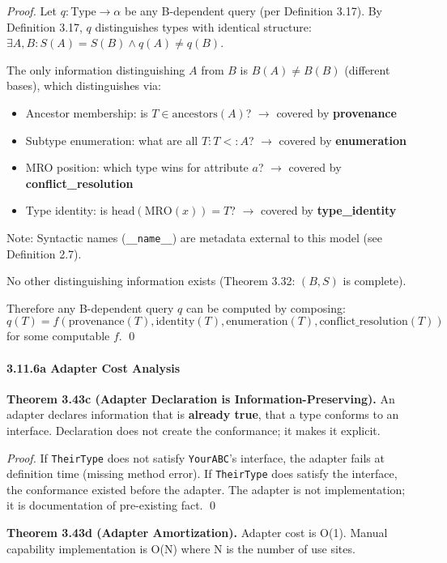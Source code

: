 \emph{Proof.} Let \(q : \text{Type} \to \alpha\) be any B-dependent
query (per Definition 3.17). By Definition 3.17, \(q\) distinguishes
types with identical structure:
\(\exists A, B: S(A) = S(B) \land q(A) \neq q(B)\).

The only information distinguishing \(A\) from \(B\) is \(B(A) \neq B(B)\) (different bases), which distinguishes via:
\begin{itemize}
  \item Ancestor membership: is \(T \in \text{ancestors}(A)\)? $\rightarrow$ covered by \textbf{provenance}
  \item Subtype enumeration: what are all \(T : T <: A\)? $\rightarrow$ covered by \textbf{enumeration}
  \item MRO position: which type wins for attribute \(a\)? $\rightarrow$ covered by \textbf{conflict\_resolution}
  \item Type identity: is \(\text{head}(\text{MRO}(x)) = T\)? $\rightarrow$ covered by \textbf{type\_identity}
\end{itemize}
Note: Syntactic names (\texttt{\_\_name\_\_}) are metadata external to this model (see Definition 2.7).

No other distinguishing information exists (Theorem 3.32: \((B, S)\)
is complete).

Therefore any B-dependent query \(q\) can be computed by composing:
\[q(T) = f(\text{provenance}(T), \text{identity}(T), \text{enumeration}(T), \text{conflict\_resolution}(T))\]
for some computable \(f\). \qed

\paragraph{3.11.6a Adapter Cost Analysis}\label{a-adapter-cost-analysis}

\textbf{Theorem 3.43c (Adapter Declaration is Information-Preserving).}
An adapter declares information that is \textbf{already true}, that a
type conforms to an interface. Declaration does not create the
conformance; it makes it explicit.

\emph{Proof.} If \texttt{TheirType} does not satisfy \texttt{YourABC}'s
interface, the adapter fails at definition time (missing method error).
If \texttt{TheirType} does satisfy the interface, the conformance
existed before the adapter. The adapter is not implementation; it is
documentation of pre-existing fact. \qed

\textbf{Theorem 3.43d (Adapter Amortization).} Adapter cost is O(1).
Manual capability implementation is O(N) where N is the number of use
sites.

